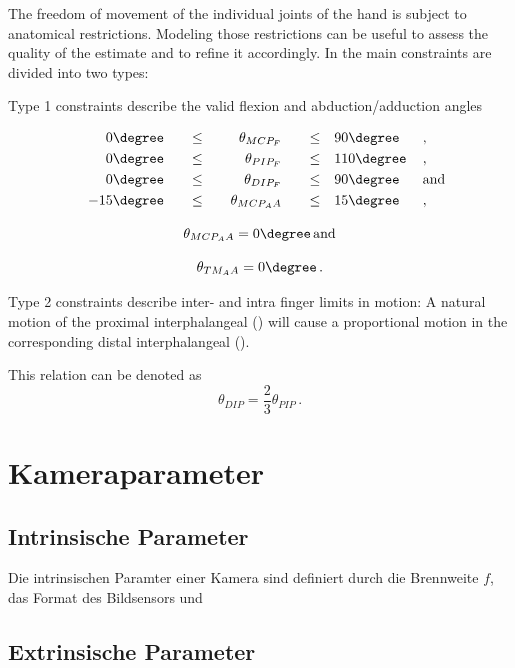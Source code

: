 	The freedom of movement of the individual joints of the hand is subject to anatomical restrictions. Modeling those restrictions can be useful to assess the quality of the estimate and to refine it accordingly. In \cite{Lin2000} the main constraints are divided into two types: 
	
	Type 1 constraints describe the valid flexion and abduction/adduction angles
	
	\begin{alignat}{7}
		&&0\degree \quad &&\leq \quad &&\theta_{MCP_F} \quad &&\leq \quad &90\degree\, &&,\\
		&&0\degree \quad &&\leq \quad &&\theta_{PIP_F} \quad &&\leq \quad &110\degree\,&& ,\\
		&&0\degree \quad &&\leq \quad &&\theta_{DIP_F} \quad &&\leq \quad &90\degree\, && \text{and}\\
		&&-15\degree \quad &&\leq \quad &&\theta_{MCP_AA} \quad &&\leq \quad &15\degree\, &&,
	\end{alignat}
	
	\begin{equation}
	\theta_{MCP_AA} = 0\degree\, \text{and}
	\end{equation}

	\begin{equation}
	\theta_{TM_AA} = 0\degree\,.
	\end{equation}
	
	Type 2 constraints describe inter- and intra finger limits in motion:
	A natural motion of the proximal interphalangeal () will cause a proportional motion in the corresponding distal interphalangeal ().
	
	This relation can be denoted as 
	\begin{equation}
	\theta_{DIP} = \frac{2}{3}\theta_{PIP}\,.
	\end{equation}
	
	
\section{Kameraparameter}
\subsection{Intrinsische Parameter}
Die intrinsischen Paramter einer Kamera sind definiert durch die Brennweite $f$, das Format des Bildsensors und 
\subsection{Extrinsische Parameter}

